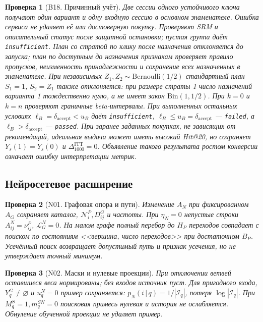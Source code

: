 \documentclass[12pt,a4paper]{article}
\newcommand{\code}[1]{{\ttfamily\small\nolinkurl{#1}}}
\newcommand{\given}{\,\vert\,}
\theoremstyle{plainru}
\newtheorem{testcase}{Проверка}[section]
\begin{document}
\begin{testcase}[B18. Причинный учёт]\label{test:eval-effect}
Две сессии одного устойчивого ключа получают один вариант и одну
входную сессию в основном знаменателе. Ошибка сервиса не удаляет её
или достоверную покупку. Проверяют SRM и описательный статус после
защитной остановки; пустая группа даёт \code{insufficient}.
План со стратой по клику после назначения отклоняется до запуска;
план по доступным до назначения признакам проверяет правило пропусков,
неизменность принадлежности и сохранение всех назначенных в знаменателе.
При независимых $Z_1,Z_2\sim\mathrm{Bernoulli}(1/2)$ стандартный план
$S_1=1$, $S_2=Z_1$ также отклоняется: при размере страты 1 число назначений
варианта 1 тождественно нулю, а не имеет закон $\mathrm{Bin}(1,1/2)$.
При $k=0$ и $k=n$ проверяют граничные beta-интервалы.
При выполненных остальных условиях $\ell_B=\delta_{\mathrm{accept}}<u_B$
даёт \code{insufficient}, $\ell_B\le u_B=\delta_{\mathrm{accept}}$ ---
\code{failed}, а $\ell_B>\delta_{\mathrm{accept}}$ --- \code{passed}.
При заранее заданных покупках, не зависящих от рекомендаций,
идеальная выдача может иметь высокий Hit@20, но сохраняет
$Y_s(1)=Y_s(0)$ и $\Delta_{1000}^{\mathrm{ITT}}=0$.
Объявление такого результата ростом конверсии означает ошибку
интерпретации метрик.
\end{testcase}

\subsection{Нейросетевое расширение}\label{app:tests-neural}

\begin{testcase}[N01. Графовая опора и пути]
Изменение $A_N$ при фиксированном $A_G$ сохраняет каталог,
$\mathcal N_i^P,D_{ij}^G$ и частоты. При $\eta_N=0$
непустые строки $A_{ij}^N=\nu_{ij}^P$, $\mathcal L_G^N=0$.
На малом графе полный перебор до $H_P$ переходов совпадает с поиском
по состояниям <<вершина, число переходов>> при достаточном $B_P$.
Усечённый поиск возвращает допустимый путь и признак усечения,
но не утверждает точный минимум.
\end{testcase}

\begin{testcase}[N02. Маски и нулевые проекции]
При отключении ветвей оставшиеся веса нормированы; без входов источник пуст.
Для пригодного входа, $Y_q^G\ne\varnothing$ и $u_q^N=0$ пример сохраняется:
$p_N(i\given q)=1/|\mathcal I_q|$, потеря $\log|\mathcal I_q|$.
При $M_q^S=1,m_q^{SN}=0$ поисковая примесь нулевая и история не ослабляется.
Обнуление обученной проекции не удаляет пример.
\end{testcase}
\end{document}
